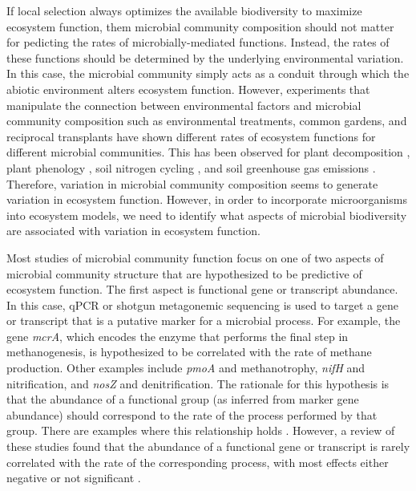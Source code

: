 \documentclass{article}
\begin{document}
If local selection always optimizes the available biodiversity to maximize
ecosystem function, them microbial community composition should not matter for
pedicting the rates of microbially-mediated functions. Instead, 
the rates of these functions should be determined by the
underlying environmental variation. In this case, the microbial community simply
acts as a conduit through which the abiotic
environment alters ecosystem function. However, experiments that manipulate the
connection between environmental factors and microbial community composition
such as environmental treatments, common gardens, and reciprocal transplants
have shown different rates of ecosystem functions for different microbial
communities. This has been observed for plant decomposition
\citep{strickland2009}, plant phenology \citep{panke-buisse2015}, soil nitrogen
cycling \citep{balser2005}, and soil greenhouse gas emissions
\citep{cavigelli2000}. Therefore, variation in microbial community composition
seems to generate variation in ecosystem function. However, in order to
incorporate microorganisms into ecosystem models, we need to identify what
aspects of microbial biodiversity are associated with variation in ecosystem
function.

Most studies of microbial community function focus on one of two aspects of
microbial community structure that are hypothesized to be predictive of
ecosystem function. The first aspect is functional gene or transcript abundance.
In this case, qPCR or shotgun metagonemic sequencing is used to target a gene
or transcript that is a putative marker for a microbial process. For example,
the gene \textit{mcrA}, which encodes the enzyme that performs the final step in
methanogenesis, is hypothesized to be correlated with the rate of
methane production. Other examples include \textit{pmoA} and methanotrophy,
\textit{nifH} and nitrification, and \textit{nosZ} and denitrification. The
rationale for this hypothesis is that the abundance of a functional group (as
inferred from marker gene abundance) should correspond to the rate of the
process performed by that group. There are examples where this relationship
holds \citep{freitag2009, freitag2010, schnyder2018}. However, a review of these
studies found that the abundance of a functional gene or transcript is rarely
correlated with the rate of the corresponding process, with most effects either
negative or not significant \citep{rocca2015}.
\end{document}
